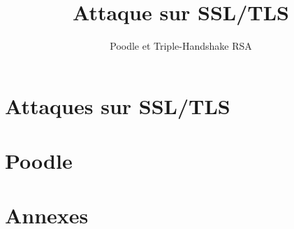 \documentclass[a4paper,openany]{memoir}
\title{Attaque sur SSL/TLS}
\subtitle{Poodle et Triple-Handshake RSA}
\begin{document}
\frontmatter%
\maketitle
 \thispagestyle{empty}

 

 \cleardoublepage
\tableofcontents*

\mainmatter%





\part{Attaques sur SSL/TLS}























\part{Poodle}
\label{part:poodle}










\part*{Annexes}
\appendix

\listoffigures 

\backmatter%

\nocite{*}



\printindex
\end{document}
